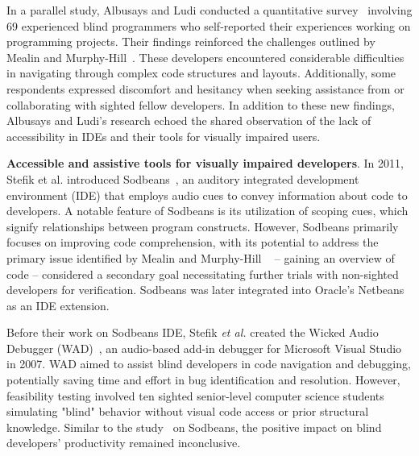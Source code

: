 In a parallel study, Albusays and Ludi conducted a quantitative survey~\cite{khaled16} involving 69 experienced blind programmers who self-reported their experiences working on programming projects. Their findings reinforced the challenges outlined by Mealin and Murphy-Hill~\cite{mealin-vlhcc12}. These developers encountered considerable difficulties in navigating through complex code structures and layouts. Additionally, some respondents expressed discomfort and hesitancy when seeking assistance from or collaborating with sighted fellow developers. In addition to these new findings, Albusays and Ludi's research echoed the shared observation of the lack of accessibility in IDEs and their tools for visually impaired users.



{\bf Accessible and assistive tools for visually impaired developers}.
In 2011, Stefik et al. introduced Sodbeans~\cite{stefik11}, an auditory
integrated development environment (IDE) that employs audio cues to
convey information about code to developers. A notable feature of
Sodbeans is its utilization of scoping cues, which signify
relationships between program constructs.
However, Sodbeans primarily focuses on improving code comprehension,
with its potential to address the primary issue identified by Mealin
and Murphy-Hill ~\cite{mealin-vlhcc12} – gaining an overview of code – considered a
secondary goal necessitating further trials with non-sighted
developers for verification. Sodbeans was later integrated into
Oracle's Netbeans as an IDE extension.

Before their work on Sodbeans IDE, Stefik {\em et al.} created the
Wicked Audio Debugger (WAD)~\cite{wad07}, an audio-based add-in debugger for
Microsoft Visual Studio in 2007. WAD aimed to assist blind developers
in code navigation and debugging, potentially saving time and effort
in bug identification and resolution. However, feasibility testing
involved ten sighted senior-level computer science students simulating
"blind" behavior without visual code access or prior structural
knowledge. Similar to the study~\cite{stefik11} on Sodbeans, the
positive impact on blind developers' productivity remained
inconclusive.

